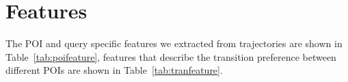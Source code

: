 \documentclass[9pt]{extarticle}
\newcommand{\eat}[1]{}
\begin{document}
\eat{
\subsection{Other models}
\label{sec:other}
Label ranking model,
Plackett-Luce probabilistic ranking


\section{Evaluation metrics}
\label{sec:evaluation}
F1 score on points
F1 score on pairs
Kendall's tau, all POIs not appeared in trajectory are ranked last (and share the same rank).
}



\section{Features}
\label{sec:feature}

\eat{
\underline{REVISE FEATURE DESIGN}
}

The POI and query specific features we extracted from trajectories are shown in Table~\ref{tab:poifeature},
features that describe the transition preference between different POIs are shown in Table~\ref{tab:tranfeature}.
\end{document}
